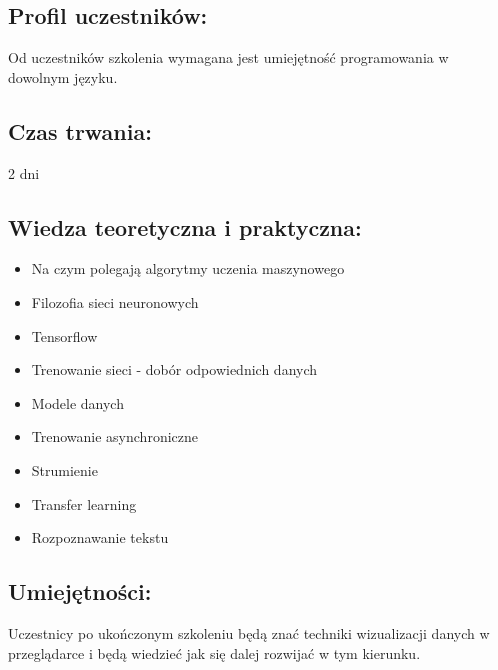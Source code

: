 \documentclass{article}[10pt]
\begin{document}
	\subsection*{Profil uczestników:}
\begin{adjustwidth}{2cm}{}
\justifying
	
Od uczestników szkolenia wymagana jest umiejętność programowania w dowolnym języku.

\end{adjustwidth}
	\subsection*{Czas trwania:}
\begin{adjustwidth}{2cm}{}
	2 dni
\end{adjustwidth}

	\subsection*{Wiedza teoretyczna i praktyczna:}
\begin{adjustwidth}{1.5cm}{}
	\begin{itemize}
		\item Na czym polegają algorytmy uczenia maszynowego
		\item Filozofia sieci neuronowych
		\item Tensorflow
		\item Trenowanie sieci - dobór odpowiednich danych
		\item Modele danych
		\item Trenowanie asynchroniczne
		\item Strumienie
		\item Transfer learning
		\item Rozpoznawanie tekstu
	\end{itemize}
\end{adjustwidth}

	\subsection*{Umiejętności:}
\begin{adjustwidth}{2cm}{}
\justifying
	
Uczestnicy po ukończonym szkoleniu będą znać techniki wizualizacji danych w przeglądarce i będą wiedzieć jak się dalej rozwijać w tym kierunku.


\end{adjustwidth}

\newpage
\end{document}
